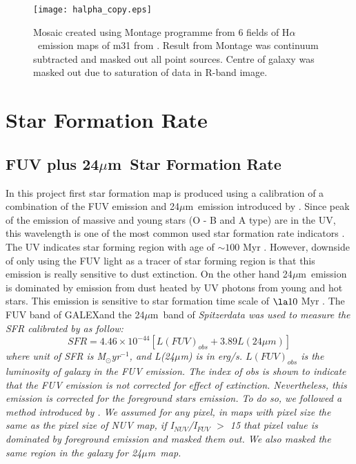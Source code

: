 \documentclass[useAMS,usenatbib]{mn2e}
\newcommand \halpha    {H$\alpha $\ }
\newcommand \um    {$\mu$m\ }
\newcommand \Spitzer {\it Spitzer}
\newcommand \Galex {GALEX}
\begin{document}
\begin{figure*}
 {\vfil  \texttt{[image: halpha\_copy.eps]}
  \caption{Mosaic created using Montage programme from 6 fields of \halpha emission maps of m31 from . Result from Montage was continuum subtracted and masked out all point sources. Centre of galaxy was masked out due to saturation of data in R-band image.\label{fig:halpha}}
 \vfil}
\end{figure*}


\section{Star Formation Rate}
\subsection{FUV plus 24\um Star Formation Rate}

In this project first star formation map is produced using a calibration of a combination of the FUV emission and 24\um emission introduced by \cite{Hao11}. Since peak of the emission of massive and young stars (O - B and A type) are in the UV, this wavelength is one of the most common used star formation rate indicators \citep[e.g.,][]{Kennicutt89}. The UV indicates star forming region with age of $\sim 100$ Myr \citep[e.g.,][]{Kennicutt98, Calzetti05}. However, downside of only using the FUV light as a tracer of star forming region is that this emission is really sensitive to dust extinction. On the other hand 24\um emission is dominated by emission from dust heated by UV photons from young and hot stars. This emission is sensitive to star formation time scale of $\la10$ Myr \citep{Calzetti07}.
The FUV band of \Galex and the 24\um band of \Spitzer data was used to measure the SFR calibrated by \cite{Hao11} as follow:
\begin{equation}
\label{equ: fuvplus24}
SFR =4.46\times10^{-44}[L(FUV)_{obs}+3.89L(24\mu m)]
\end{equation}
where unit of SFR is M$_{\odot}$yr$^{-1}$, and L(24$\mu$m) is in erg/s. $L(FUV)_{obs}$ is the luminosity of galaxy in the FUV emission. The index of obs is shown to indicate that the FUV emission is not corrected for effect of extinction. Nevertheless, this emission is corrected for the foreground stars emission. To do so, we followed a method introduced by \cite{Leroy08}. We assumed for any pixel, in maps with pixel size the same as the pixel size of NUV map, if I$_{NUV}$/I$_{FUV}$ $>$ 15 that pixel value is dominated by foreground emission and masked them out. We also masked the same region in the galaxy for 24\um map.
\end{document}
